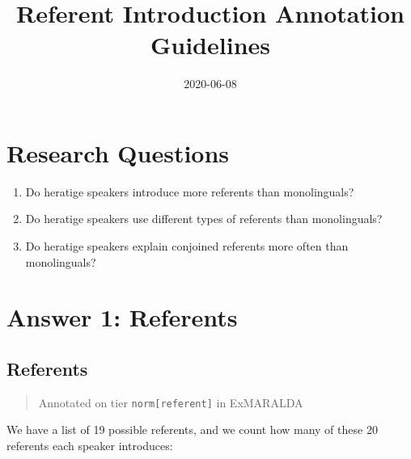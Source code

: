 \documentclass[
]{book}
\title{Referent Introduction Annotation Guidelines}
\author{}
\date{\vspace{-2.5em}2020-06-08}
\begin{document}
\maketitle

{
\setcounter{tocdepth}{1}
\tableofcontents
}
\hypertarget{research-questions}{%
\chapter{Research Questions}\label{research-questions}}

\begin{enumerate}
\def\labelenumi{\arabic{enumi}.}
\item
  Do heratige speakers introduce more referents than monolinguals?
\item
  Do heratige speakers use different types of referents than monolinguals?
\item
  Do heratige speakers explain conjoined referents more often than monolinguals?
\end{enumerate}

\hypertarget{answer-1-referents}{%
\chapter{Answer 1: Referents}\label{answer-1-referents}}

\hypertarget{referents}{%
\section{Referents}\label{referents}}

\begin{quote}
Annotated on tier \texttt{norm{[}referent{]}} in ExMARALDA
\end{quote}

We have a list of 19 possible referents, and we count how many of these 20 referents each speaker introduces:
\end{document}
